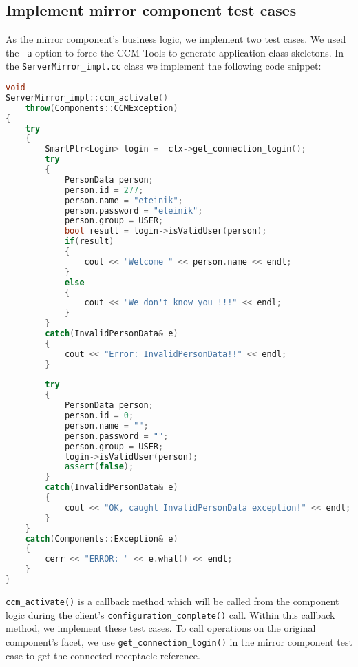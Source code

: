 \subsection{Implement mirror component test cases}
\label{subsection:ImplementMirrorComponentTestCasesCxx}
As the mirror component's business logic, we implement two test cases.
We used the {\tt -a} option to force the CCM Tools to generate application class
skeletons.
In the {\tt ServerMirror\_impl.cc} class we implement the following code snippet:
\begin{footnotesize}
\begin{lstlisting}[language=C++]
void
ServerMirror_impl::ccm_activate()
    throw(Components::CCMException)
{
    try
    {
        SmartPtr<Login> login =  ctx->get_connection_login();
        try 
        {
            PersonData person;
            person.id = 277;
            person.name = "eteinik";
            person.password = "eteinik";
            person.group = USER;
            bool result = login->isValidUser(person);
            if(result) 
            {
                cout << "Welcome " << person.name << endl;
            }
            else 
            {
                cout << "We don't know you !!!" << endl;
            }
        }
        catch(InvalidPersonData& e) 
        {
            cout << "Error: InvalidPersonData!!" << endl;
        }
        
        try 
        {
            PersonData person;
            person.id = 0;
            person.name = "";
            person.password = "";
            person.group = USER;      
            login->isValidUser(person);
            assert(false);
        }
        catch(InvalidPersonData& e) 
        {
            cout << "OK, caught InvalidPersonData exception!" << endl;
        }
    }
    catch(Components::Exception& e)
    {
        cerr << "ERROR: " << e.what() << endl;
    }
}
\end{lstlisting} 
\end{footnotesize}

{\tt ccm\_activate()} is a callback method which will be called from the component 
logic during the client's {\tt configuration\_complete()} call.
Within this callback method, we implement these test cases. 
To call operations on the original component's facet, we use {\tt get\_connection\_login()} 
in the mirror component test case to get the connected receptacle reference. 

